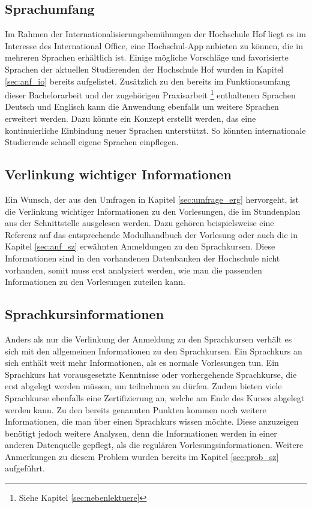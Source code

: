 \subsection*{Sprachumfang}

Im Rahmen der Internationalisierungsbemühungen der Hochschule Hof liegt es im Interesse des International Office, eine Hochschul-\ac{App} anbieten zu können, die in mehreren Sprachen erhältlich ist. Einige mögliche Vorschläge und favorisierte Sprachen der aktuellen Studierenden der Hochschule Hof wurden in Kapitel \ref{sec:anf_io} bereits aufgelistet. Zusätzlich zu den bereits im Funktionsumfang dieser Bachelorarbeit und der zugehörigen Praxisarbeit \footnote{Siehe Kapitel \ref{sec:nebenlektuere}} enthaltenen Sprachen Deutsch und Englisch kann die Anwendung ebenfalls um weitere Sprachen erweitert werden. Dazu könnte ein Konzept erstellt werden, das eine kontinuierliche Einbindung neuer Sprachen unterstützt. So könnten internationale Studierende schnell eigene Sprachen einpflegen. 

\subsection*{Verlinkung wichtiger Informationen}

Ein Wunsch, der aus den Umfragen in Kapitel \ref{sec:umfrage_erg} hervorgeht, ist die Verlinkung wichtiger Informationen zu den Vorlesungen, die im Stundenplan aus der Schnittstelle ausgelesen werden. Dazu gehören beispielsweise eine Referenz auf das entsprechende Modulhandbuch der Vorlesung oder auch die in Kapitel \ref{sec:anf_sz} erwähnten Anmeldungen zu den Sprachkursen. Diese Informationen sind in den vorhandenen Datenbanken der Hochschule nicht vorhanden, somit muss erst analysiert werden, wie man die passenden Informationen zu den Vorlesungen zuteilen kann.

\subsection*{Sprachkursinformationen}

Anders als nur die Verlinkung der Anmeldung zu den Sprachkursen verhält es sich mit den allgemeinen Informationen zu den Sprachkursen. Ein Sprachkurs an sich enthält weit mehr Informationen, als es normale Vorlesungen tun. Ein Sprachkurs hat vorausgesetzte Kenntnisse oder vorhergehende Sprachkurse, die erst abgelegt werden müssen, um teilnehmen zu dürfen. Zudem bieten viele Sprachkurse ebenfalls eine Zertifizierung an, welche am Ende des Kurses abgelegt werden kann. Zu den bereits genannten Punkten kommen noch weitere Informationen, die man über einen Sprachkurs wissen möchte. Diese anzuzeigen benötigt jedoch weitere Analysen, denn die Informationen werden in einer anderen Datenquelle gepflegt, als die regulären Vorlesungsinformationen. Weitere Anmerkungen zu diesem Problem wurden bereits im Kapitel \ref{sec:prob_sz} aufgeführt. 

